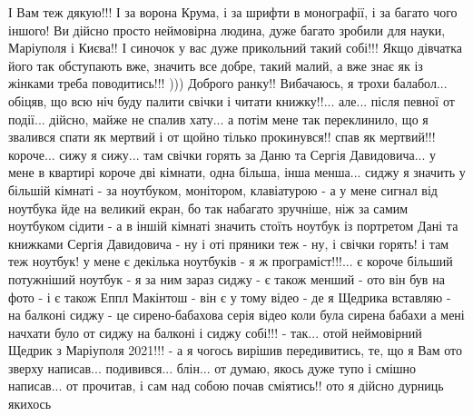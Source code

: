 І Вам теж дякую!!! І за ворона Крума, і за шрифти в монографії, і за багато
чого іншого!  Ви дійсно просто неймовірна людина, дуже багато зробили для
науки, Маріуполя і Києва!!  І синочок у вас дуже прикольний такий собі!!! Якщо
дівчатка його так обступають вже, значить все добре, такий малий, а вже знає як
із жінками треба поводитись!!! ))) Доброго ранку!! Вибачаюсь, я трохи
балабол... обіцяв, що всю ніч буду палити свічки і читати книжку!!...  але...
після певної от події...  дійсно, майже не спалив хату... а потім мене так
переклинило, що я звалився спати як мертвий і от щойно тілько прокинувся!!
спав як мертвий!!! короче...  сижу я сижу... там свічки горять за Даню та
Сергія Давидовича... у мене в квартирі короче дві кімнати, одна більша, інша
менша... сиджу я значить у більшій кімнаті - за ноутбуком, монітором,
клавіатурою - а у мене сигнал від ноутбука йде на великий екран, бо так
набагато зручніше, ніж за самим ноутбуком сідити - а в іншій кімнаті значить
стоїть ноутбук із портретом Дані та книжками Сергія Давидовича - ну і оті
пряники теж - ну, і свічки горять! і там теж ноутбук! у мене є декілька
ноутбуків - я ж програміст!!!... є короче більший потужніший ноутбук - я за ним
зараз сиджу - є також менший - ото він був на фото - і є також Еппл Макінтош -
він є у тому відео - де я Щедрика вставляю - на балконі сиджу - це
сирено-бабахова серія відео коли була сирена бабахи а мені начхати було от
сиджу на балконі і сиджу собі!!! - так... отой неймовірний Щедрик з Маріуполя
2021!!! - а я чогось вирішив передивитись, те, що я Вам ото зверху написав...
подивився... блін... от думаю, якось дуже тупо і смішно написав...  от
прочитав, і сам над собою почав сміятись!! ото я дійсно дурниць якихось

